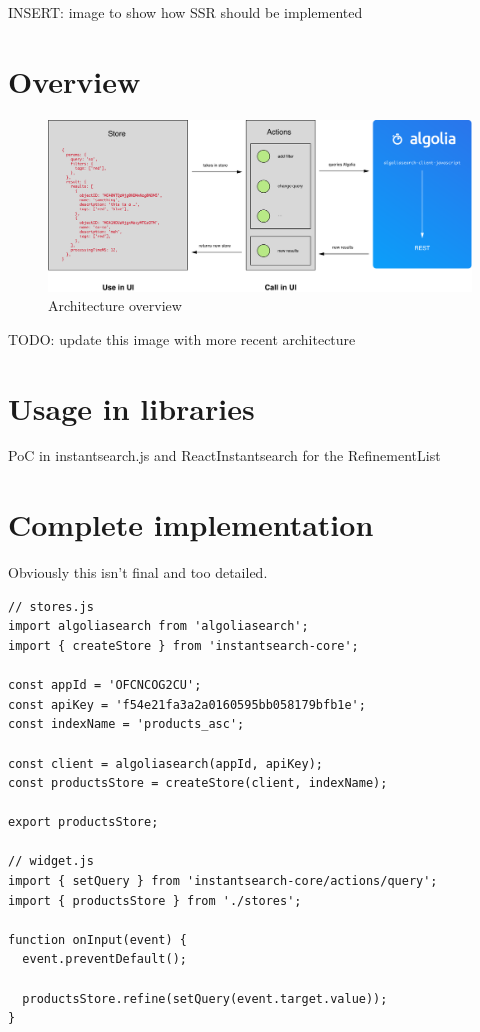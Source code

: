 INSERT: image to show how SSR should be implemented %


\section{Overview} %
\label{sec:overview}

\begin{figure}[H]
\label{figure:core-architecture}
  \centering
  \includegraphics[width=\textwidth]{../assets/architecture.pdf}
  \caption{Architecture overview\cite{blog-architecture}}
\end{figure}

TODO: update this image with more recent architecture %


\section{Usage in libraries} %
\label{sec:usage_in_libraries}

PoC in instantsearch.js and ReactInstantsearch for the RefinementList %


\section{Complete implementation} %
\label{sec:complete_implementation}

Obviously this isn't final and too detailed. %

\begin{lstlisting}[caption={Using instantsearch-core},label={lst:is-core-usage}]
// stores.js
import algoliasearch from 'algoliasearch';
import { createStore } from 'instantsearch-core';

const appId = 'OFCNCOG2CU';
const apiKey = 'f54e21fa3a2a0160595bb058179bfb1e';
const indexName = 'products_asc';

const client = algoliasearch(appId, apiKey);
const productsStore = createStore(client, indexName);

export productsStore;

// widget.js
import { setQuery } from 'instantsearch-core/actions/query';
import { productsStore } from './stores';

function onInput(event) {
  event.preventDefault();

  productsStore.refine(setQuery(event.target.value));
}
\end{lstlisting}


